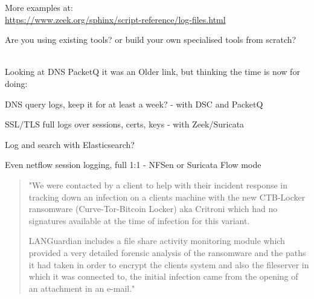 \documentclass[20pt,landscape,a4paper,footrule]{foils}
\begin{document}
More examples at:\\
\url{https://www.zeek.org/sphinx/script-reference/log-files.html}




Are you using existing tools? or build your own specialised tools from scratch?\\

{\footnotesize
{}\\
}



Looking at DNS PacketQ it was an Older link, but thinking the time is now for doing:

\begin{list2}
\item DNS query logs, keep it for at least a week? - with DSC and PacketQ
\item SSL/TLS full logs over sessions, certs, keys - with Zeek/Suricata\\
\item Log and search with Elasticsearch?\\
\item Even netflow session logging, full 1:1 - NFSen or Suricata Flow mode
\end{list2}



\begin{quote}
"We were contacted by a client to help with their incident response in tracking down an
infection on a clients machine with the new CTB-Locker ransomware (Curve-Tor-Bitcoin Locker)
aka Critroni which had no signatures available at the time of infection for this variant.

LANGuardian includes a file share activity monitoring module which provided a very
detailed forensic analysis of the ransomware and the paths it had taken in order to
encrypt the clients system and also the fileserver in which it was connected to, the
initial infection came from the opening of an attachment in an e-mail."
\end{quote}
\end{document}
